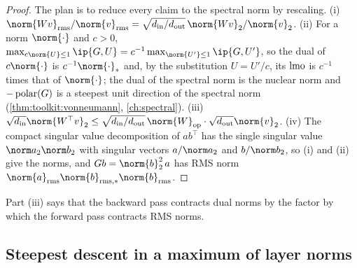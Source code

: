 \begin{refsection}

\begin{proof}
The plan is to reduce every claim to the spectral norm by rescaling. (i) $\norm{Wv}_\rms/\norm{v}_\rms=\sqrt{\modularin/\modularout}\,\norm{Wv}_2/\norm{v}_2$. (ii) For a norm $\norm{\cdot}$ and $c>0$, $\max_{c\norm{U}\le1}\ip{G,U}=c^{-1}\max_{\norm{U'}\le1}\ip{G,U'}$, so the dual of $c\norm{\cdot}$ is $c^{-1}\norm{\cdot}_*$ and, by the substitution $U=U'/c$, its $\operatorname{lmo}$ is $c^{-1}$ times that of $\norm{\cdot}$; the dual of the spectral norm is the nuclear norm and $-\operatorname{polar}(G)$ is a steepest unit direction of the spectral norm (\cref{thm:toolkit:vonneumann}, \cref{ch:spectral}). (iii) $\sqrt{\modularin}\norm{W^\top v}_2\le\sqrt{\modularin/\modularout}\,\norm{W}_{\op}\cdot\sqrt{\modularout}\norm{v}_2$. (iv) The compact singular value decomposition of $ab^\top$ has the single singular value $\norm a_2\norm b_2$ with singular vectors $a/\norm a_2$ and $b/\norm b_2$, so (i) and (ii) give the norms, and $Gb=\norm{b}_2^2\,a$ has RMS norm $\norm{a}_\rms\norm{b}_{\rms,*}\norm{b}_\rms$.
\end{proof}

Part (iii) says that the backward pass contracts dual norms by the factor by which the forward pass contracts RMS norms.

\subsection{Steepest descent in a maximum of layer norms}


\end{refsection}
